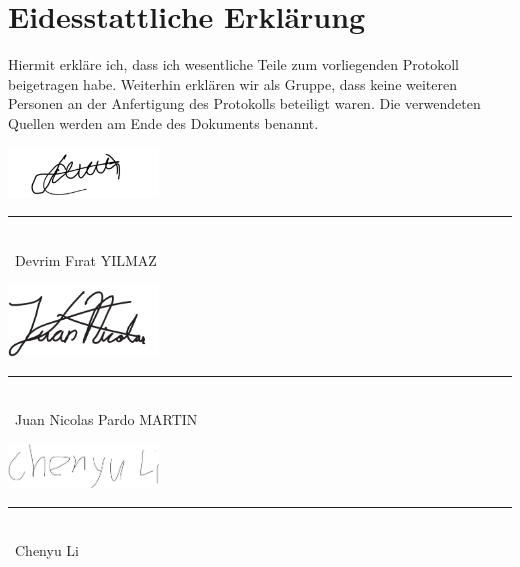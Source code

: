 %
%
%
\section*{Eidesstattliche Erklärung}
%
Hiermit erkläre ich, dass ich wesentliche Teile zum vorliegenden Protokoll beigetragen habe. Weiterhin erklären wir als Gruppe, dass keine weiteren Personen an der Anfertigung des Protokolls beteiligt waren. Die verwendeten Quellen werden am Ende des Dokuments benannt.
%
\par
\vspace{1.5cm}
%
\hspace{0.5cm}\includegraphics[width=4cm]{Elektronik-Laborprotokoll_Filter/Unterschriften/Devrim_Unterschrift.pdf} \\
\rule{5cm}{0.5pt}\\
\ Devrim Fırat YILMAZ
%
\par
\vspace{1.5cm}
%
\hspace{0.5cm}\includegraphics[width=4cm]{Elektronik-Laborprotokoll_Filter/Unterschriften/kjuan.pdf} \\
\rule{5cm}{0.5pt}\\
\ Juan Nicolas Pardo MARTIN
%
\par
\vspace{1.5cm}
%
\hspace{0.5cm}\includegraphics[width=4cm]{Elektronik-Laborprotokoll_Filter/Unterschriften/Chenyu_Unterschrift.jpg} \\
\rule{5cm}{0.5pt}\\
\ Chenyu Li
%
%
%

%

%
%
%